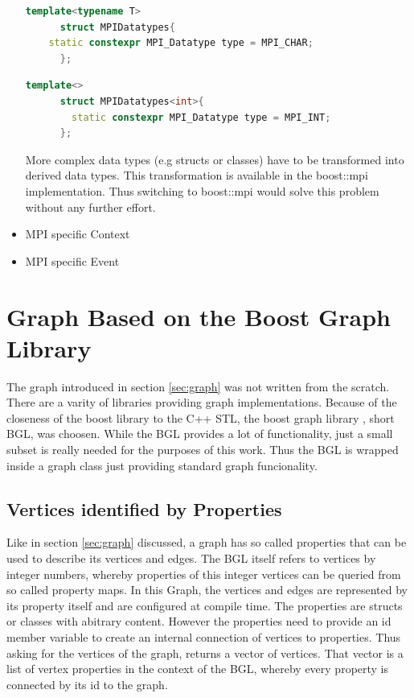 \begin{itemize}
    \begin{lstlisting}[language=C++, label=lst:mpi_trait1]
      template<typename T>
      struct MPIDatatypes{
	static constexpr MPI_Datatype type = MPI_CHAR;
      };
    \end{lstlisting}

    \begin{lstlisting}[language=C++, label=lst:mpi_trait2]
      template<>
      struct MPIDatatypes<int>{
    	static constexpr MPI_Datatype type = MPI_INT;
      };

    \end{lstlisting}

    More complex data types (e.g structs or classes) have to be
    transformed into derived data types. This transformation is
    available in the boost::mpi implementation. Thus switching to
    boost::mpi \cite{ref:boost::mpi} would solve this problem without
    any further effort.

  \item MPI specific Context
  \item MPI specific Event
  \end{itemize}

\section{Graph Based on the Boost Graph Library}

  The graph introduced in section \ref{sec:graph} was not written from
  the scratch. There are a varity of libraries providing graph
  implementations. Because of the closeness of the boost library to
  the C++ STL, the boost graph library \cite{ref:boost::bgl}, short
  BGL, was choosen. While the BGL provides a lot of functionality,
  just a small subset is really needed for the purposes of this
  work. Thus the BGL is wrapped inside a graph class just providing
  standard graph funcionality.



  \subsection{Vertices identified by Properties}

    Like in section \ref{sec:graph} discussed, a graph has so called
    properties that can be used to describe its vertices and
    edges. The BGL itself refers to vertices by integer numbers,
    whereby properties of this integer vertices can be queried from so
    called property maps. In this Graph, the vertices and edges are represented
    by its property itself and are configured at compile time.  The
    properties are structs or classes with abitrary content. However
    the properties need to provide an id member variable to create an
    internal connection of vertices to properties.  Thus asking for
    the vertices of the graph, returns a vector of vertices. That
    vector is a list of vertex properties in the context of the BGL,
    whereby every property is connected by its id to the graph.
  
